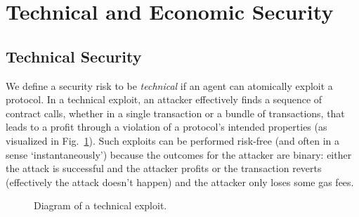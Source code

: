 \section{Technical and Economic Security}
\subsection{Technical Security}
\label{sec:5:technical-security}

We define a security risk to be \emph{technical} if an agent can atomically exploit a protocol.
In a technical exploit, an attacker effectively finds a sequence of contract calls, whether in a single transaction or a bundle of transactions, that leads to a profit through a violation of a protocol's intended properties (as visualized in Fig.~\ref{fig:technical-security-illustration}).
Such exploits can be performed risk-free (and often in a sense `instantaneously') because the outcomes for the attacker are binary: either the attack is successful and the attacker profits or the transaction reverts (effectively the attack doesn't happen) and the attacker only loses some gas fees.

\begin{figure}[htp]
  \centering
      \caption{Diagram of a technical exploit.}
      \label{fig:technical-security-illustration}
\end{figure}

